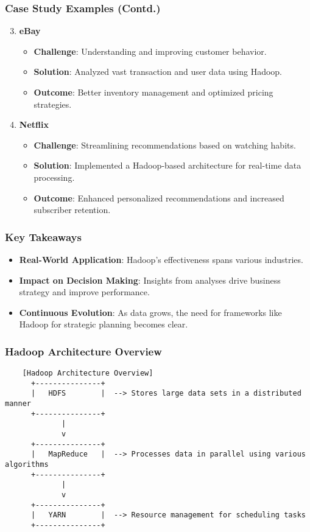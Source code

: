 \documentclass[aspectratio=169]{beamer}
\begin{document}
\begin{frame}[fragile]
    \frametitle{Case Study Examples (Contd.)}
    \begin{enumerate}
        \setcounter{enumi}{2}
        \item \textbf{eBay}
            \begin{itemize}
                \item \textbf{Challenge}: Understanding and improving customer behavior.
                \item \textbf{Solution}: Analyzed vast transaction and user data using Hadoop.
                \item \textbf{Outcome}: Better inventory management and optimized pricing strategies.
            \end{itemize}
        \item \textbf{Netflix}
            \begin{itemize}
                \item \textbf{Challenge}: Streamlining recommendations based on watching habits.
                \item \textbf{Solution}: Implemented a Hadoop-based architecture for real-time data processing.
                \item \textbf{Outcome}: Enhanced personalized recommendations and increased subscriber retention.
            \end{itemize}
    \end{enumerate}
\end{frame}

\begin{frame}[fragile]
    \frametitle{Key Takeaways}
    \begin{itemize}
        \item \textbf{Real-World Application}: Hadoop's effectiveness spans various industries.
        \item \textbf{Impact on Decision Making}: Insights from analyses drive business strategy and improve performance.
        \item \textbf{Continuous Evolution}: As data grows, the need for frameworks like Hadoop for strategic planning becomes clear.
    \end{itemize}
\end{frame}

\begin{frame}[fragile]
    \frametitle{Hadoop Architecture Overview}
    \begin{lstlisting}
    [Hadoop Architecture Overview]
      +---------------+
      |   HDFS        |  --> Stores large data sets in a distributed manner
      +---------------+
             |
             v
      +---------------+
      |   MapReduce   |  --> Processes data in parallel using various algorithms
      +---------------+
             |
             v
      +---------------+
      |   YARN        |  --> Resource management for scheduling tasks
      +---------------+
    \end{lstlisting}
\end{frame}
\end{document}
